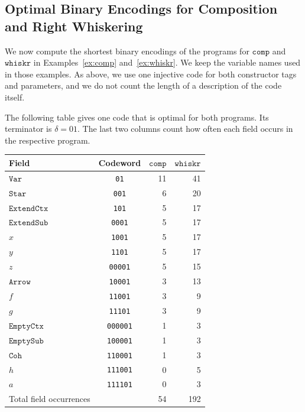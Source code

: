 \documentclass{article}%
\theoremstyle{remark}
\theoremstyle{definition}
\theoremstyle{definition}
\theoremstyle{plain}
\begin{document}
\subsection{Optimal Binary Encodings for Composition and Right Whiskering}
We now compute the shortest binary encodings of the programs for $\mathtt{comp}$
and $\mathtt{whiskr}$ in Examples~\ref{ex:comp} and~\ref{ex:whiskr}. We keep the
variable names used in those examples. As above, we use one injective code for
both constructor tags and parameters, and we do not count the length of a
description of the code itself.

The following table gives one code that is optimal for both programs. Its
terminator is $\delta=01$. The last two columns count how often each field
occurs in the respective program.

\begin{center}
\begin{tabular}{lcrr}
\hline
Field & Codeword & $\mathtt{comp}$ & $\mathtt{whiskr}$ \\
\hline
$\mathtt{Var}$       & \texttt{01}     & 11 & 41 \\
$\mathtt{Star}$      & \texttt{001}    &  6 & 20 \\
$\mathtt{ExtendCtx}$ & \texttt{101}    &  5 & 17 \\
$\mathtt{ExtendSub}$ & \texttt{0001}   &  5 & 17 \\
$x$                  & \texttt{1001}   &  5 & 17 \\
$y$                  & \texttt{1101}   &  5 & 17 \\
$z$                  & \texttt{00001}  &  5 & 15 \\
$\mathtt{Arrow}$     & \texttt{10001}  &  3 & 13 \\
$f$                  & \texttt{11001}  &  3 &  9 \\
$g$                  & \texttt{11101}  &  3 &  9 \\
$\mathtt{EmptyCtx}$  & \texttt{000001} &  1 &  3 \\
$\mathtt{EmptySub}$  & \texttt{100001} &  1 &  3 \\
$\mathtt{Coh}$       & \texttt{110001} &  1 &  3 \\
$h$                  & \texttt{111001} &  0 &  5 \\
$a$                  & \texttt{111101} &  0 &  3 \\
\hline
Total field occurrences & & 54 & 192 \\
\hline
\end{tabular}
\end{center}
\end{document}
